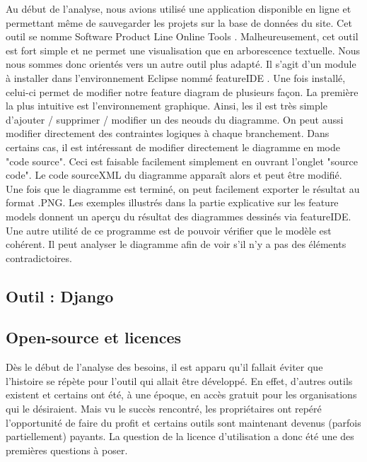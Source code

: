 Au début de l'analyse,  nous avions utilisé une application disponible en ligne et permettant même de sauvegarder les projets sur la base de données du site.  Cet outil se nomme Software Product Line Online Tools \cite{splot}.  Malheureusement,  cet outil est fort simple et ne permet une visualisation que en arborescence textuelle.  Nous nous sommes donc orientés vers un autre outil plus adapté.  Il s'agit d'un module à installer dans l'environnement Eclipse \cite{eclipse} nommé featureIDE \cite{featureIDE}.  Une fois installé,  celui-ci permet de modifier notre feature diagram de plusieurs façon.  La première la plus intuitive est l'environnement graphique.  Ainsi,  les il est très simple d'ajouter / supprimer / modifier un des neouds du diagramme.  On peut aussi modifier directement des contraintes logiques à chaque branchement.  Dans certains cas,  il est intéressant de modifier directement le diagramme en mode "code source".   Ceci est faisable facilement simplement en ouvrant l'onglet "source code".  Le code sourceXML du diagramme apparaît alors et peut être modifié.   
Une fois que le diagramme est terminé,  on peut facilement exporter le résultat au format .PNG.  Les exemples illustrés dans la partie explicative sur les feature models donnent un aperçu du résultat des diagrammes dessinés via featureIDE.  Une autre utilité de ce programme est de pouvoir vérifier que le modèle est cohérent.  Il peut analyser le diagramme afin de voir s'il n'y a pas des éléments contradictoires.

\subsection{Outil : Django}



\subsection{Open-source et licences}

Dès le début de l'analyse des besoins,  il est apparu qu'il fallait éviter que l'histoire se répète pour l'outil qui allait être développé. En effet,  d'autres outils existent et certains ont été,  à une époque,  en accès gratuit pour les organisations qui le désiraient.  Mais vu le succès rencontré,  les propriétaires ont repéré l'opportunité de faire du profit et certains outils sont maintenant devenus (parfois partiellement) payants.  La question de la licence d'utilisation a donc été une des premières questions à poser.  

